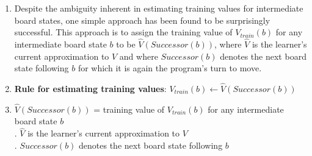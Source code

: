 \begin{enumerate}[itemsep=0.2cm]
    \item Despite the ambiguity inherent in estimating training values for intermediate board states, one simple approach has been found to be surprisingly successful.
    This approach is to assign the training value of $V_{train}(b)$ for any intermediate board state $b$ to be $\hat{V}(Successor(b))$, where $\hat{V}$ is the learner's current approximation to $V$ and where $Successor(b)$ denotes the next board state following $b$ for which it is again the program's turn to move.
    \hfill \cite{ml/book/Machine-Learning/Tom-M-Mitchell}

    \item 
    \textbf{Rule for estimating training values}: $V_{train}(b) \gets \hat{V}(Successor(b))$
    \hfill \cite{ml/book/Machine-Learning/Tom-M-Mitchell}
    
    \item 
    $\hat{V}(Successor(b))$ = training value of $V_{train}(b)$ for any intermediate board state $b$
    \\
    .\hspace{1cm} $\hat{V}$ is the learner's current approximation to $V$
    \\
    .\hspace{1cm} $Successor(b)$ denotes the next board state following $b$
    \vspace{0.3cm} \noindent
    
\end{enumerate}

































